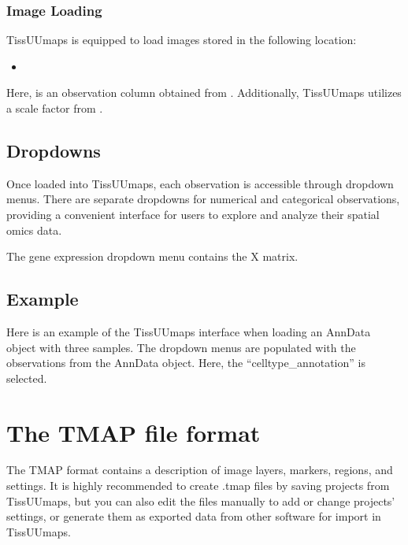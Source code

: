 \documentclass[letterpaper,10pt,english,openany,oneside]{sphinxmanual}
\begin{document}
\subsubsection{Image Loading}
\label{\detokenize{docs/advanced/anndata:image-loading}}
\sphinxAtStartPar
TissUUmaps is equipped to load images stored in the following location:
\begin{itemize}
\item {} 
\sphinxAtStartPar
{}

\end{itemize}

\sphinxAtStartPar
Here,  is an observation column obtained from . Additionally, TissUUmaps utilizes a scale factor from .


\subsection{Dropdowns}
\label{\detokenize{docs/advanced/anndata:dropdowns}}
\sphinxAtStartPar
Once loaded into TissUUmaps, each observation is accessible through dropdown menus. There are separate dropdowns for numerical and categorical observations, providing a convenient interface for users to explore and analyze their spatial omics data.

\sphinxAtStartPar
The gene expression dropdown menu contains the X matrix.

\sphinxAtStartPar
{}


\subsection{Example}
\label{\detokenize{docs/advanced/anndata:example}}
\sphinxAtStartPar
Here is an example of the TissUUmaps interface when loading an AnnData object with three samples. The dropdown menus are populated with the observations from the AnnData object. Here, the “celltype\_annotation” is selected.

\sphinxAtStartPar
{}

\sphinxstepscope


\section{The TMAP file format}
\label{\detokenize{docs/advanced/tmap:the-tmap-file-format}}\label{\detokenize{docs/advanced/tmap::doc}}
\sphinxAtStartPar
The TMAP format contains a description of image layers, markers, regions, and settings. It is highly recommended to create .tmap files by saving projects from TissUUmaps, but you can also edit the files manually to add or change projects’ settings, or generate them as exported data from other software for import in TissUUmaps.
\end{document}
